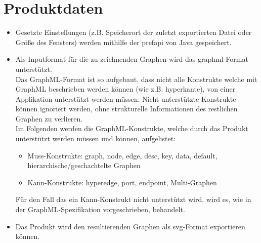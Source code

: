 \chapter{Produktdaten}\label{ch:daten}

\begin{itemize}
  \item Gesetzte Einstellungen (z.B. Speicherort der zuletzt exportierten Datei oder Größe des Fensters) werden mithilfe der \gls{prefapi} von Java gespeichert.
  \item Als Inputformat für die zu zeichnenden Graphen wird das \gls{graphml}-Format unterstützt.\\
    Das GraphML-Format\cite{Brandes2002} ist so aufgebaut, dass nicht alle Konstrukte welche mit GraphML beschrieben werden können (wie z.B. \gls{hyperkante}),
    von einer Applikation unterstützt werden müssen.
    Nicht unterstützte Konstrukte können ignoriert werden, ohne strukturelle Informationen des restlichen Graphen zu verlieren.\\
    Im Folgenden werden die GraphML-Konstrukte, welche durch das Produkt unterstützt werden müssen und können, aufgelistet:
    \begin{itemize}
      \item Muss-Konstrukte: graph, node, edge, desc, key, data, default, hierarchische/geschachtelte Graphen  %
      \item Kann-Konstrukte: hyperedge, port, endpoint, Multi-Graphen
    \end{itemize}
    Für den Fall das ein Kann-Konstrukt nicht unterstützt wird, wird es, wie in der GraphML-Spezifikation\cite{GraphMLSpecs} vorgeschrieben, behandelt.
  \item Das Produkt wird den resultierenden Graphen als \gls{svg}-Format exportieren können.
\end{itemize}
